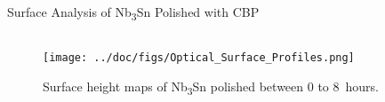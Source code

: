 \documentclass{beamer}
\begin{document}
\begin{frame}{}
\begin{columns}[t]
            \begin{column}{0.32\linewidth}    
                \begin{block}{\label{sec:samplestudy}Surface Analysis of Nb\textsubscript{3}Sn Polished with CBP}
                    \begin{columns}[t]
                        \begin{column}{0.42\columnwidth}
                            \begin{figure}[t]
                                \centering
                                \texttt{[image: ../doc/figs/Optical\_Surface\_Profiles.png]}
                                \caption{\label{fig:opticalsurfaceprofiles}Surface height maps of Nb\textsubscript{3}Sn polished between 0 to 8~hours.}
                            \end{figure}


\end{column}
\end{columns}
\end{block}
\end{column}
\end{columns}
\end{frame}
\end{document}
